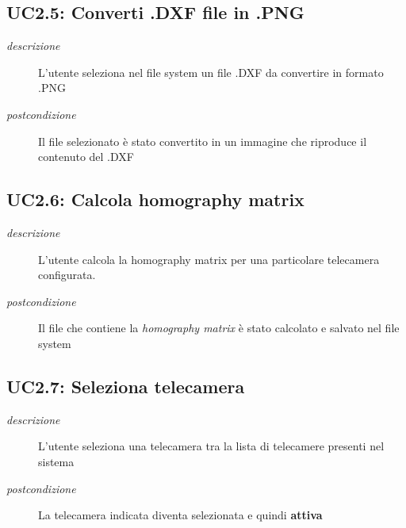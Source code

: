 \subsection{UC2.5: Converti .DXF file in .PNG} \label{sec:UC2.5}
\begin{description}
\item[\em{descrizione }]L'utente seleziona nel file system un file .DXF da convertire in formato .PNG 
\item[\em{postcondizione }] Il file selezionato è stato convertito in un immagine che riproduce il contenuto del .DXF
\end{description}

\subsection{UC2.6: Calcola homography matrix} \label{sec:UC2.6}
\begin{description}
\item[\em{descrizione }]L'utente calcola la homography matrix per una particolare telecamera configurata.
\item[\em{postcondizione }] Il file che contiene la \textit{homography matrix} è stato calcolato e salvato nel file system
\end{description}

\subsection{UC2.7: Seleziona telecamera} \label{sec:UC2.7}
\begin{description}
\item[\em{descrizione }]L'utente seleziona una telecamera tra la lista di telecamere presenti nel sistema
\item[\em{postcondizione }] La telecamera indicata diventa selezionata e quindi \textbf{attiva}
\end{description}

